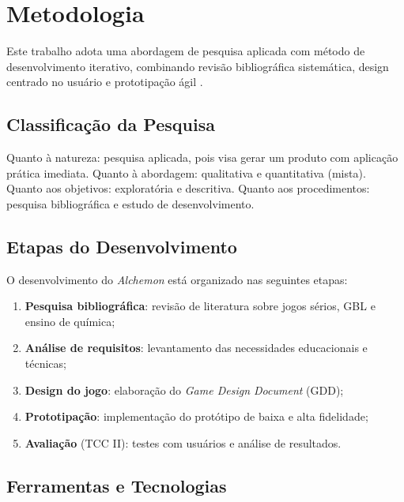 
\section{Metodologia}

Este trabalho adota uma abordagem de pesquisa aplicada com método de
desenvolvimento iterativo, combinando revisão bibliográfica sistemática,
design centrado no usuário e prototipação ágil \cite{mayer2019serious}.

\subsection{Classificação da Pesquisa}

Quanto à natureza: pesquisa aplicada, pois visa gerar um produto com
aplicação prática imediata. Quanto à abordagem: qualitativa e quantitativa
(mista). Quanto aos objetivos: exploratória e descritiva. Quanto aos
procedimentos: pesquisa bibliográfica e estudo de desenvolvimento.


\subsection{Etapas do Desenvolvimento}

O desenvolvimento do \textit{Alchemon} está organizado nas seguintes etapas:

\begin{enumerate}[1.]
    \item \textbf{Pesquisa bibliográfica}: revisão de literatura sobre jogos
          sérios, GBL e ensino de química;
    \item \textbf{Análise de requisitos}: levantamento das necessidades
          educacionais e técnicas;
    \item \textbf{Design do jogo}: elaboração do \textit{Game Design Document} (GDD);
    \item \textbf{Prototipação}: implementação do protótipo de baixa e alta fidelidade;
    \item \textbf{Avaliação} (TCC II): testes com usuários e análise de resultados.
\end{enumerate}

\subsection{Ferramentas e Tecnologias}

